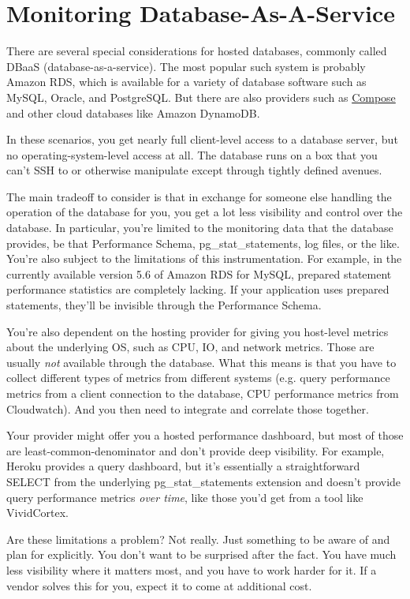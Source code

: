 \documentclass{vivid_layout}
\begin{document}
\section{Monitoring Database-As-A-Service}

There are several special considerations for hosted databases, commonly called
DBaaS (database-as-a-service). The most popular such system is probably Amazon
RDS, which is available for a variety of database software such as MySQL,
Oracle, and PostgreSQL. But there are also providers such as
\href{http://compose.io}{Compose} and other cloud databases like Amazon
DynamoDB.

In these scenarios, you get nearly full client-level access to a
database server, but no operating-system-level access at all. The database runs
on a box that you can't SSH to or otherwise manipulate except through tightly
defined avenues.

The main tradeoff to consider is that in exchange for someone else handling the
operation of the database for you, you get a lot less visibility and control
over the database. In particular, you're limited to the monitoring data that the
database provides, be that Performance Schema, pg\_stat\_statements, log files,
or the like.  You're also subject to the limitations of this
instrumentation. For example, in the currently available version 5.6 of Amazon
RDS for MySQL, prepared statement performance statistics are completely lacking.
If your application uses prepared statements, they'll be invisible through the
Performance Schema.

You're also dependent on the hosting provider for giving you host-level metrics
about the underlying OS, such as CPU, IO, and network metrics. Those are
usually \emph{not} available through the database. What this means is that you
have to collect different types of metrics from different systems (e.g. query
performance metrics from a client connection to the database, CPU performance
metrics from Cloudwatch). And you then need to integrate and correlate those
together.

Your provider might offer you a hosted performance dashboard, but most of
those are least-common-denominator and don't provide deep visibility. For
example, Heroku provides a query dashboard, but it's essentially a
straightforward SELECT from the underlying pg\_stat\_statements extension and
doesn't provide query performance metrics \emph{over time}, like those you'd get
from a tool like VividCortex.

Are these limitations a problem? Not really. Just something to be aware of and
plan for explicitly. You don't want to be surprised after the fact. You
have much less visibility where it matters most, and you have to work harder for it. If a vendor
solves this for you, expect it to come at additional cost.
\end{document}

